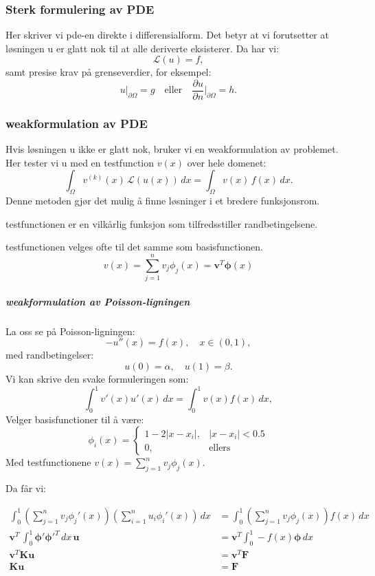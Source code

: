 \subsubsection{Sterk formulering av PDE}
Her skriver vi \gls{pde}-en direkte i differensialform. Det betyr at vi forutsetter at løsningen u er glatt nok til at alle deriverte eksisterer. Da har vi:
\[
  \mathcal{L}(u) = f,
\]
samt presise krav på grenseverdier, for eksempel:
\[
  u|_{\partial \Omega} = g \quad \text{eller} \quad \frac{\partial u}{\partial n}\bigg|_{\partial \Omega} = h.
\]

\subsubsection{\gls{weakformulation} av PDE}
Hvis løsningen u ikke er glatt nok, bruker vi en \gls{weakformulation} av problemet.
Her tester vi u med en \gls{testfunction} \(v(x)\) over hele domenet:
\[
  \int_\Omega v^{(k)}(x) \, \mathcal{L}(u(x)) \, dx = \int_\Omega v(x) \, f(x) \, dx.
\]
Denne metoden gjør det mulig å finne løsninger i et bredere funksjonsrom.

\gls{testfunction}en er en vilkårlig funksjon som tilfredsstiller randbetingelsene.

\gls{testfunction}en velges ofte til det samme som \gls{basisfunction}en.
\[
  v(x) = \sum_{j=1}^n v_j \phi_j(x) = \symbf{v}^T \symbf{\phi}(x)
\]

\subparagraph{\gls{weakformulation} av Poisson-ligningen}
La oss se på Poisson-ligningen:
\[
  -u''(x) = f(x), \quad x \in (0,1),
\]
med randbetingelser:
\[
  u(0) = \alpha, \quad u(1) = \beta.
\]
Vi kan skrive den svake formuleringen som:
\[
  \int_0^1 v'(x) u'(x) \, dx = \int_0^1 v(x) f(x) \, dx,
\]
Velger \gls{basisfunction}er til å være:
\[
  \phi_i(x) = \begin{cases}
    1 - 2|x - x_i|, & |x - x_i| < 0.5 \\
    0,              & \text{ellers}
  \end{cases}
\]
Med \gls{testfunction}ene \(v(x) = \sum_{j=1}^n v_j \phi_j(x)\).

Da får vi:

\begin{align*}
  \int_0^1 \left( \sum_{j=1}^n v_j \phi_j'(x) \right)
  \left( \sum_{i=1}^n u_i \phi_i'(x) \right) \, dx
                      & =
  \int_0^1 \left( \sum_{j=1}^n v_j \phi_j(x) \right) f(x) \, dx \\
  \symbf{v}^T \, \int_0^1 \symbf{\phi}' \symbf{\phi}'^T \, dx \, \symbf{u}
                      & =
  \symbf{v}^T \int_0^1 - f(x) \symbf{\phi}  \, dx               \\
  \symbf{v}^T \symbf{K} \symbf{u}
                      & =
  \symbf{v}^T \symbf{F}                                         \\
  \symbf{K} \symbf{u} & = \symbf{F}
\end{align*}



